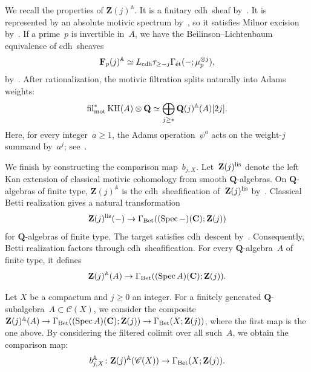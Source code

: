 \documentclass[11pt,a4paper]{amsart}
\numberwithin{equation}{section}
\theoremstyle{plain}
\theoremstyle{definition}
\theoremstyle{remark}
\newcommand{\ZZ}{\mathbf{Z}}
\newcommand{\FF}{\mathbf{F}}
\newcommand{\QQ}{\mathbf{Q}}
\newcommand{\CC}{\mathbf{C}}
\newcommand{\AA}{\mathbb{A}}
\newcommand{\et}{\textnormal{ét}}
\newcommand{\lis}{\textnormal{lis}}
\newcommand{\mot}{\textnormal{mot}}
\newcommand{\Bet}{\textnormal{Bet}}
\newcommand{\cdh}{\textnormal{cdh}}
\newcommand{\Spec}{\operatorname{Spec}}
\newcommand{\KH}{\operatorname{KH}}
\newcommand{\fil}{\operatorname{fil}}
\newcommand{\X}{\mathord{-}}
\newcommand{\Cls}[1]{\mathscr{#1}}
\begin{document}
We recall the properties of \(\ZZ(j)^{\AA}\).
It is a finitary cdh~sheaf
by~\cite[Theorem~1.1\,(3)]{BachmannElmantoMorrow}.
It is represented by an absolute motivic spectrum
by~\cite[Theorem~1.6]{BachmannElmantoMorrow},
so it satisfies Milnor
excision by~\cite[Corollary~1.2]{EHIK21M}.
If a prime~\(p\) is invertible in~\(A\),
we have the Beilinson–Lichtenbaum equivalence of cdh~sheaves
\begin{equation}\label{e:bl}
  \FF_p(j)^{\AA}
  \simeq
  L_{\cdh}\tau_{\geq-j}
  \Gamma_{\et}(\X;\mu_p^{\otimes j}),
\end{equation}
by~\cite[Theorem~1.1\,(4)]{BachmannElmantoMorrow}.
After rationalization,
the motivic filtration splits naturally into
Adams weights:
\begin{equation}\label{e:splitting}
  \fil_{\mot}^{*}{\KH(A)\otimes\QQ}
  \simeq
  \bigoplus_{j\geq *}
  \QQ(j)^{\AA}(A)[2j].
\end{equation}
Here, for every integer~\(a\geq1\),
the Adams operation~\(\psi^a\) acts
on the weight-\(j\) summand by~\(a^j\);
see~\cite[Theorems~4.47 and~4.48]{BachmannElmantoMorrow}.

We finish by constructing the comparison map~\(b_{j,X}\).
Let~\(\ZZ(j)^{\lis}\) denote the left Kan extension of classical
motivic cohomology from smooth \(\QQ\)-algebras.
On \(\QQ\)-algebras of finite type,
\(\ZZ(j)^{\AA}\) is
the cdh~sheafification of~\(\ZZ(j)^{\lis}\)
by~\cite[Theorem~7.5, Remark~7.9, and
Corollary~1.11]{BachmannElmantoMorrow}.
Classical Betti realization gives a natural transformation
\begin{equation*}
  \ZZ(j)^{\lis}(\X)
  \to
  \Gamma_{\Bet}((\Spec\X)(\CC);\ZZ(j))
\end{equation*}
for \(\QQ\)-algebras of finite type.
The target satisfies cdh~descent
by~\cite[Theorems~4.4 and~3.11]{k-ros-1}.
Consequently,
Betti realization factors through cdh~sheafification.
For every \(\QQ\)-algebra~\(A\) of finite type, it defines
\begin{equation}
  \ZZ(j)^{\AA}(A)
  \to
  \Gamma_{\Bet}((\Spec A)(\CC);\ZZ(j)).
\end{equation}

\begin{definition}\label{xou9xb}
  Let \(X\) be a compactum
  and \(j\geq0\) an integer.
  For a finitely generated \(\QQ\)-subalgebra~\(A\subset\Cls{C}(X)\),
  we consider
  the composite
  \(\ZZ(j)^{\AA}(A)\to\Gamma_{\Bet}((\Spec A)(\CC);\ZZ(j))\to
  \Gamma_{\Bet}(X;\ZZ(j))\),
  where the first map is the one above.
  By considering the filtered colimit over all such~\(A\),
  we obtain the comparison map:
  \begin{equation*}
    b^{\AA}_{j,X}\colon
    \ZZ(j)^{\AA}(\Cls{C}(X))
    \to \Gamma_{\Bet}(X;\ZZ(j)).
  \end{equation*}
\end{definition}
\end{document}
